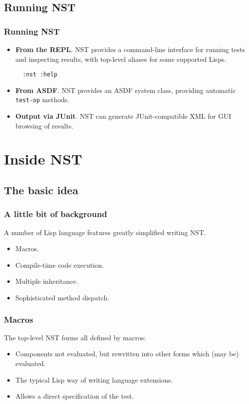 \documentclass{beamer}
\begin{document}
\subsection*{Running NST}

\begin{frame}[fragile]
  \frametitle{Running NST}
  
  \begin{itemize}
  \item<1->\textbf{From the REPL}.  NST provides a command-line
    interface for running tests and inspecting results, with top-level
    aliases for some supported Lisps.
\begin{verbatim}
  :nst :help
\end{verbatim}
  \item<2->\textbf{From ASDF}.  NST provides an ASDF system class,
    providing automatic \texttt{test-op} methods.

  \item<3->\textbf{Output via JUnit}.  NST can generate
    JUnit-compatible XML for GUI browsing of results.

  \end{itemize}
\end{frame}

\section{Inside NST}

\subsection{The basic idea}

\begin{frame}
  \frametitle{A little bit of background}

  A number of Lisp language features greatly simplified writing NST.
  \begin{itemize}
  \item Macros.
  \item Compile-time code execution.
  \item Multiple inheritance.
  \item Sophisticated method dispatch.
  \end{itemize}  
\end{frame}

\begin{frame}
  \frametitle{Macros}

  The top-level NST forms all defined by macros:
  \begin{itemize}
  \item Components not evaluated, but rewritten into other forms which
    (may be) evaluated.
  \item The typical Lisp way of writing language extensions.
  \item Allows a direct specification of the test.
  \end{itemize}
\end{frame}
\end{document}
